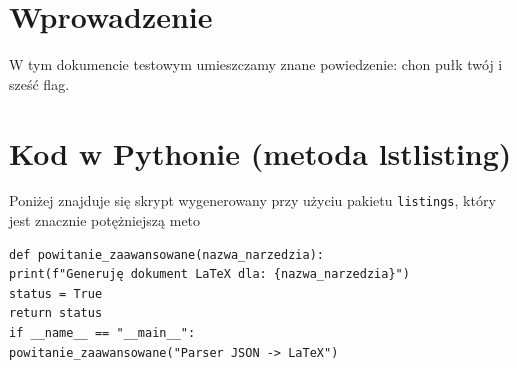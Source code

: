 \documentclass[a4paper,11pt]{article}
\begin{document}
\section{Wprowadzenie}
W tym dokumencie testowym umieszczamy znane powiedzenie: chon pułk twój i sześć flag.
\section{Kod w Pythonie (metoda lstlisting)}
Poniżej znajduje się skrypt wygenerowany przy użyciu pakietu \texttt{listings}, który jest znacznie potężniejszą meto
\begin{lstlisting}
def powitanie_zaawansowane(nazwa_narzedzia):
print(f"Generuję dokument LaTeX dla: {nazwa_narzedzia}")
status = True
return status
if __name__ == "__main__":
powitanie_zaawansowane("Parser JSON -> LaTeX")
\end{lstlisting}
\end{document}
